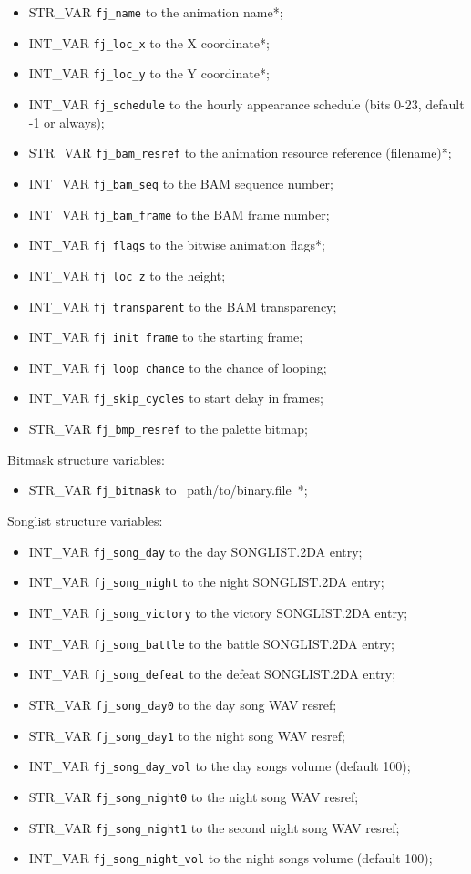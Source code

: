 \documentclass{article}
\begin{document}
\begin{itemize}
\item STR_VAR \verb+fj_name+ to the animation name*;
\item INT_VAR \verb+fj_loc_x+ to the X coordinate*;
\item INT_VAR \verb+fj_loc_y+ to the Y coordinate*;
\item INT_VAR \verb+fj_schedule+ to the hourly appearance schedule (bits 0-23, default -1 or always);
\item STR_VAR \verb+fj_bam_resref+ to the animation resource reference (filename)*;
\item INT_VAR \verb+fj_bam_seq+ to the BAM sequence number;
\item INT_VAR \verb+fj_bam_frame+ to the BAM frame number;
\item INT_VAR \verb+fj_flags+ to the bitwise animation flags*;
\item INT_VAR \verb+fj_loc_z+ to the height;
\item INT_VAR \verb+fj_transparent+ to the BAM transparency;
\item INT_VAR \verb+fj_init_frame+ to the starting frame;
\item INT_VAR \verb+fj_loop_chance+ to the chance of looping;
\item INT_VAR \verb+fj_skip_cycles+ to start delay in frames;
\item STR_VAR \verb+fj_bmp_resref+ to the palette bitmap;
\end{itemize}
Bitmask structure variables:
\begin{itemize}
\item STR_VAR \verb+fj_bitmask+ to ~path/to/binary.file~*;
\end{itemize}
Songlist structure variables:
\begin{itemize}
\item INT_VAR \verb+fj_song_day+ to the day SONGLIST.2DA entry;
\item INT_VAR \verb+fj_song_night+ to the night SONGLIST.2DA entry;
\item INT_VAR \verb+fj_song_victory+ to the victory SONGLIST.2DA entry;
\item INT_VAR \verb+fj_song_battle+ to the battle SONGLIST.2DA entry;
\item INT_VAR \verb+fj_song_defeat+ to the defeat SONGLIST.2DA entry;
\item STR_VAR \verb+fj_song_day0+ to the day song WAV resref;
\item STR_VAR \verb+fj_song_day1+ to the night song WAV resref;
\item INT_VAR \verb+fj_song_day_vol+ to the day songs volume (default 100);
\item STR_VAR \verb+fj_song_night0+ to the night song WAV resref;
\item STR_VAR \verb+fj_song_night1+ to the second night song WAV resref;
\item INT_VAR \verb+fj_song_night_vol+ to the night songs volume (default 100);
\end{itemize}
\end{document}
